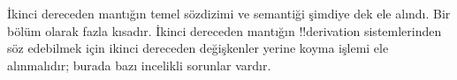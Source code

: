\documentclass[../../../include/open-logic-chapter]{subfiles}
\begin{document}

\begin{editorial}
İkinci dereceden mantığın temel sözdizimi ve semantiği şimdiye dek ele
alındı. Bir bölüm olarak fazla kısadır. İkinci dereceden mantığın
!!{derivation} sistemlerinden söz edebilmek için ikinci dereceden değişkenler
yerine koyma işlemi ele alınmalıdır; burada bazı incelikli sorunlar vardır.
\end{editorial}







\OLEndChapterHook
\end{document}
